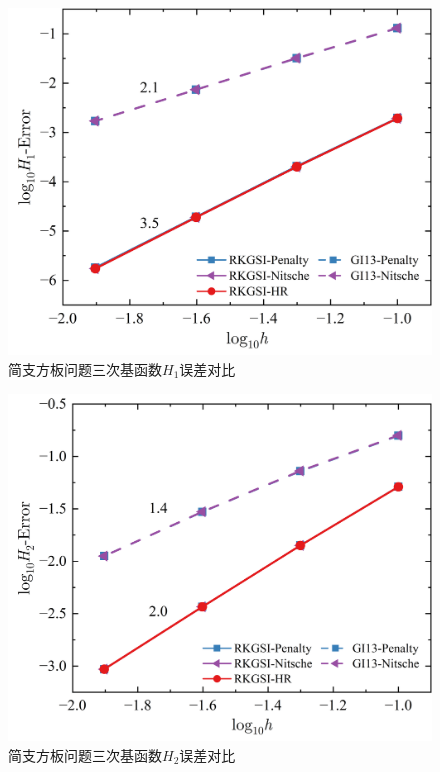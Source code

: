 \newpage
\begin{figure}[H]
    \centering
    \includegraphics[scale=0.5]{figure/PHR/R/CH1.png}
    \caption{简支方板问题三次基函数$H_1$误差对比}
\end{figure}
\begin{figure}[H]
    \centering
    \includegraphics[scale=0.5]{figure/PHR/R/CH2.png}
    \caption{简支方板问题三次基函数$H_2$误差对比}
\end{figure}
\newpage
